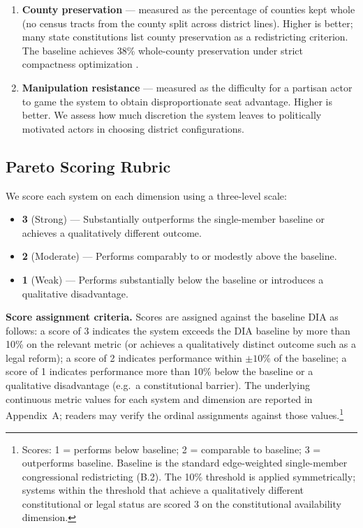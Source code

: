 \begin{enumerate}
  \item \textbf{County preservation} --- measured as the percentage of
        counties kept whole (no census tracts from the county split across
        district lines).  Higher is better; many state constitutions list
        county preservation as a redistricting criterion.  The baseline
        achieves 38\% whole-county preservation under strict compactness
        optimization \citep{dellaLibera2026mec}.

  \item \textbf{Manipulation resistance} --- measured as the difficulty for a
        partisan actor to game the system to obtain disproportionate seat
        advantage.  Higher is better.  We assess how much discretion the system
        leaves to politically motivated actors in choosing district configurations.
\end{enumerate}

\subsection{Pareto Scoring Rubric}

We score each system on each dimension using a three-level scale:
\begin{itemize}
  \item \textbf{3} (Strong) --- Substantially outperforms the single-member
        baseline or achieves a qualitatively different outcome.
  \item \textbf{2} (Moderate) --- Performs comparably to or modestly above
        the baseline.
  \item \textbf{1} (Weak) --- Performs substantially below the baseline or
        introduces a qualitative disadvantage.
\end{itemize}

\noindent\textbf{Score assignment criteria.}  Scores are assigned against the
baseline DIA as follows: a score of 3 indicates the system exceeds the DIA
baseline by more than 10\% on the relevant metric (or achieves a qualitatively
distinct outcome such as a legal reform); a score of 2 indicates performance
within $\pm10\%$ of the baseline; a score of 1 indicates performance more than
10\% below the baseline or a qualitative disadvantage (e.g.\ a constitutional
barrier).  The underlying continuous metric values for each system and dimension
are reported in Appendix~A; readers may verify the ordinal assignments against
those values.\footnote{Scores: 1 = performs below baseline; 2 = comparable to
baseline; 3 = outperforms baseline.  Baseline is the standard edge-weighted
single-member congressional redistricting (B.2).  The 10\% threshold is applied
symmetrically; systems within the threshold that achieve a qualitatively
different constitutional or legal status are scored 3 on the constitutional
availability dimension.}

